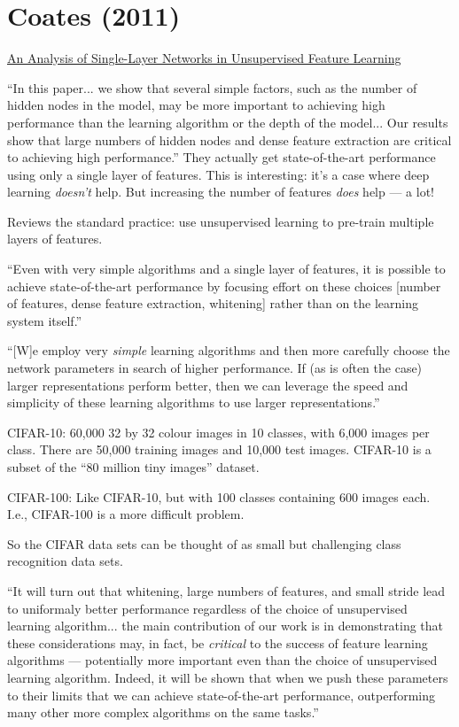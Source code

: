 \documentclass[12pt]{report}
\newcommand{\link}[2]{\href{#1}{#2}}
\begin{document}
\section{Coates (2011)}

\link{http://www.stanford.edu/~acoates/papers/coatesleeng\_aistats\_2011.pdf}{An
  Analysis of Single-Layer Networks in Unsupervised Feature Learning}

``In this paper... we show that several simple factors, such as the
number of hidden nodes in the model, may be more important to
achieving high performance than the learning algorithm or the depth of
the model... Our results show that large numbers of hidden nodes and
dense feature extraction are critical to achieving high performance.''
They actually get state-of-the-art performance using only a single
layer of features.  This is interesting: it's a case where deep
learning \emph{doesn't} help.  But increasing the number of features
\emph{does} help --- a lot!

Reviews the standard practice: use unsupervised learning to pre-train
multiple layers of features.  

``Even with very simple algorithms and a single layer of features, it
is possible to achieve state-of-the-art performance by focusing effort
on these choices [number of features, dense feature extraction,
whitening] rather than on the learning system itself.''

``[W]e employ very \emph{simple} learning algorithms and then more
carefully choose the network parameters in search of higher
performance.  If (as is often the case) larger representations perform
better, then we can leverage the speed and simplicity of these
learning algorithms to use larger representations.''

CIFAR-10: 60,000 32 by 32 colour images in 10 classes, with 6,000
images per class.  There are 50,000 training images and 10,000 test
images.  CIFAR-10 is a subset of the ``80 million tiny images''
dataset.

CIFAR-100: Like CIFAR-10, but with 100 classes containing 600 images
each.  I.e., CIFAR-100 is a more difficult problem.

So the CIFAR data sets can be thought of as small but challenging
class recognition data sets.

``It will turn out that whitening, large numbers of features, and
small stride lead to uniformaly better performance regardless of the
choice of unsupervised learning algorithm... the main contribution of
our work is in demonstrating that these considerations may, in fact,
be \emph{critical} to the success of feature learning algorithms ---
potentially more important even than the choice of unsupervised
learning algorithm.  Indeed, it will be shown that when we push these
parameters to their limits that we can achieve state-of-the-art
performance, outperforming many other more complex algorithms on the
same tasks.''
\end{document}
